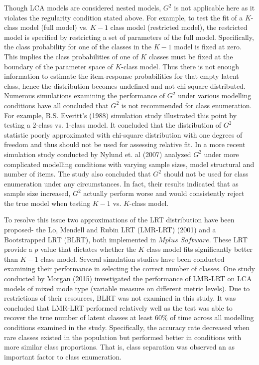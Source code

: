 Though LCA models are considered nested models, $G^2$ is not applicable here as it violates the regularity condition stated above. For example, to test the fit of a $K$-class model (full model) vs. $K-1$ class model (restricted model), the restricted model is specified by restricting a set of parameters of the full model. Specifically, the class probability for one of the classes in the $K-1$ model is fixed at zero. This implies the class probabilities of one of $K$ classes must be fixed at the boundary of the parameter space of $K$-class model. Thus there is not enough information to estimate the item-response probabilities for that empty latent class, hence the distribution becomes undefined and not chi square distributed. Numerous simulations examining the performance of $G^2$ under various modelling conditions have all concluded that $G^2$ is not recommended for class enumeration. For example, B.S. Everitt's (1988) simulation study illustrated this point by testing a 2-class vs. 1-class model. It concluded that the distribution of $G^2$ statistic poorly approximated with chi-square distribution with one degrees of freedom and thus should not be used for assessing relative fit. In a more recent simulation study conducted by Nylund et. al (2007) analyzed $G^2$ under more complicated modelling conditions with varying sample sizes, model structural and number of items. The study also concluded that $G^2$ should not be used for class enumeration under any circumstances. In fact, their results indicated that as sample size increased, $G^2$ actually perform worse and would consistently reject the true model when testing $K-1$ vs. $K$-class model. 

To resolve this issue two approximations of the LRT distribution have been proposed- the Lo, Mendell and Rubin LRT (LMR-LRT) (2001) and a Bootstrapped LRT (BLRT), both implemented in $Mplus$ $Software$. These LRT provide a $p$ value that dictates whether the $K$ class model fits significantly better than $K-1$ class model. Several simulation studies have been conducted examining their performance in selecting the correct number of classes. One study conducted by Morgan (2015) investigated the performance of LMR-LRT on LCA models of mixed mode type (variable measure on different metric levels). Due to restrictions of their resources, BLRT was not examined in this study. It was concluded that LMR-LRT performed relatively well as the test was able to recover the true number of latent classes at least $60\%$ of time across all modelling conditions examined in the study. Specifically, the accuracy rate decreased when rare classes existed in the population but performed better in conditions with more similar class proportions. That is, class separation was observed an as important factor to class enumeration. 


